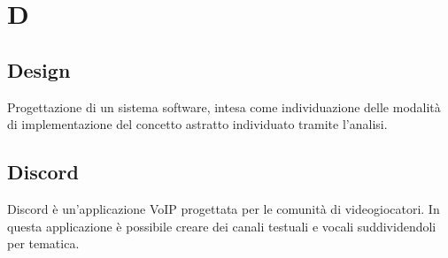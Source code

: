 \section{D}
	\subsection{Design}  
		Progettazione di un sistema software, intesa come individuazione delle modalità di implementazione del concetto astratto individuato tramite l'analisi.
	\subsection{Discord}  
		Discord è un'applicazione VoIP progettata per le comunità di videogiocatori. In questa applicazione è possibile creare dei canali testuali e vocali suddividendoli per tematica. 


\newpage
